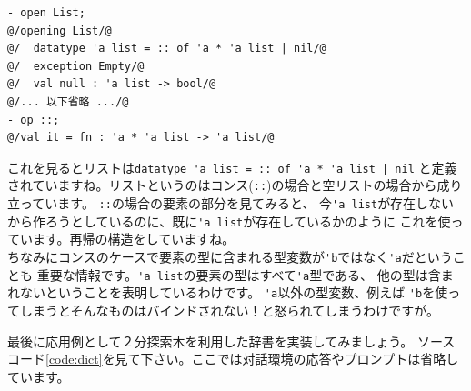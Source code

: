 \documentclass[11pt,a4paper]{article}
\begin{document}
\begin{lstlisting}[caption=リストの定義を確認する,label=code:open-list]
- open List;
@/opening List/@
@/  datatype 'a list = :: of 'a * 'a list | nil/@
@/  exception Empty/@
@/  val null : 'a list -> bool/@
@/... 以下省略 .../@
- op ::;
@/val it = fn : 'a * 'a list -> 'a list/@
\end{lstlisting}

これを見るとリストは\lstinline{datatype 'a list = :: of 'a * 'a list | nil}
と定義されていますね。リストというのはコンス(\lstinline{::})の場合と空リストの場合から成り立っています。
\lstinline{::}の場合の要素の部分を見てみると、
今\lstinline{'a list}が存在しないから作ろうとしているのに、既に\lstinline{'a list}が存在しているかのように
これを使っています。再帰の構造をしていますね。\\
ちなみにコンスのケースで要素の型に含まれる型変数が\lstinline{'b}ではなく\lstinline{'a}だということも
重要な情報です。\lstinline{'a list}の要素の型はすべて\lstinline{'a}型である、
他の型は含まれないということを表明しているわけです。
\lstinline{'a}以外の型変数、例えば
\lstinline{'b}を使ってしまうとそんなものはバインドされない！と怒られてしまうわけですが。


最後に応用例として２分探索木を利用した辞書を実装してみましょう。
ソースコード\ref{code:dict}を見て下さい。ここでは対話環境の応答やプロンプトは省略しています。
\end{document}
